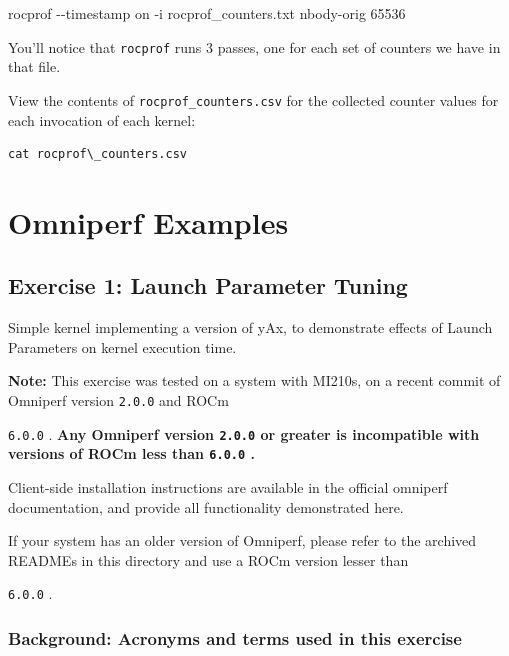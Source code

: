 \documentclass[
]{article}
\let\oldtexttt\texttt
\renewcommand{\texttt}[1]{
  \colorbox{Light}{\oldtexttt{#1}}
}
\newenvironment{Shaded}{}{}
\newcommand{\ExtensionTok}[1]{#1}
\newcommand{\NormalTok}[1]{#1}
\begin{document}
\begin{Shaded}
\begin{Highlighting}[]
\ExtensionTok{rocprof}\NormalTok{ {-}{-}timestamp on {-}i rocprof\_counters.txt  nbody{-}orig 65536}
\end{Highlighting}
\end{Shaded}

You'll notice that \texttt{rocprof} runs 3 passes, one for each set of
counters we have in that file.

View the contents of \texttt{rocprof\_counters.csv} for the collected
counter values for each invocation of each kernel:

\begin{verbatim}
cat rocprof\_counters.csv
\end{verbatim}

\pagebreak

\hypertarget{omniperf-examples}{%
\section{Omniperf Examples}\label{omniperf-examples}}

\hypertarget{exercise-1-launch-parameter-tuning}{%
\subsection{Exercise 1: Launch Parameter
Tuning}\label{exercise-1-launch-parameter-tuning}}

Simple kernel implementing a version of yAx, to demonstrate effects of
Launch Parameters on kernel execution time.

\textbf{Note:} This exercise was tested on a system with MI210s, on a
recent commit of Omniperf version \texttt{2.0.0} and ROCm
\texttt{6.0.0}. \textbf{Any Omniperf version \texttt{2.0.0} or greater
is incompatible with versions of ROCm less than \texttt{6.0.0}.}

Client-side installation instructions are available in the official
omniperf documentation, and provide all functionality demonstrated here.

If your system has an older version of Omniperf, please refer to the
archived READMEs in this directory and use a ROCm version lesser than
\texttt{6.0.0}.

\subsubsection*{Background: Acronyms and terms used in this exercise}
\end{document}
